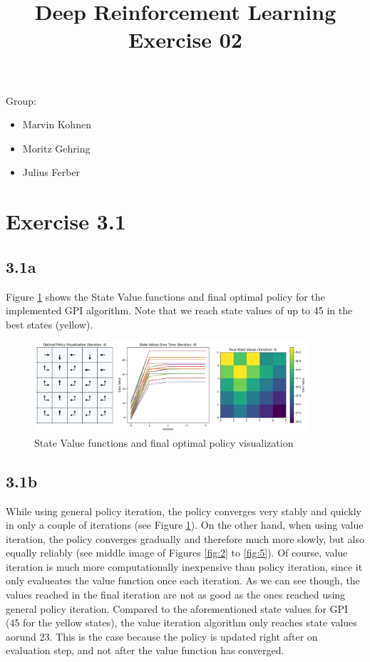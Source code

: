 \documentclass{article} %
\begin{document}
	
	\title{Deep Reinforcement Learning Exercise 02}
	\maketitle
	
	Group:
	\begin{itemize}
		\item Marvin Kohnen
		\item Moritz Gehring
		\item Julius Ferber 
		
	\end{itemize}
	\section{Exercise 3.1}

	\subsection{3.1a}
		Figure \ref{fig:1} shows the State Value functions and final optimal policy for the implemented GPI algorithm. Note that we reach state values of up to 45 in the best states (yellow). 
	\begin{figure}[h!]
		\centering
		\includegraphics[width=0.9\textwidth]{images/3.1a.png}
		\caption{State Value functions and final optimal policy visualization}
		\label{fig:1}
	\end{figure}
	
	\subsection{3.1b}
	 
 	While using general policy iteration, the policy converges very stably and quickly in only a couple of iterations (see Figure \ref{fig:1}). On the other hand, when using value iteration, the policy converges gradually and therefore much more slowly, but also equally reliably (see middle image of Figures \ref{fig:2} to \ref{fig:5}). 
	Of course, value iteration is much more computationally inexpensive than policy iteration, since it only evalueates the value function once each iteration.  As we can see though, the values reached in the final iteration are not as good as the ones reached using general policy iteration. Compared to the aforementioned state values for GPI (45 for the yellow states), the value iteration algorithm only reaches state values aorund 23. This is the case because the policy is updated right after on evaluation step, and not after the value function has converged.
	
\end{document}
